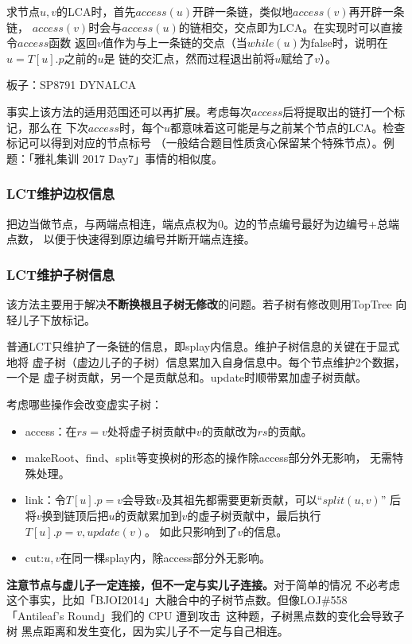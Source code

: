 求节点$u,v$的LCA时，首先$access(u)$开辟一条链，类似地$access(v)$再开辟一条链，
$access(v)$时会与$access(u)$的链相交，交点即为LCA。在实现时可以直接令$access$函数
返回$v$值作为与上一条链的交点（当$while(u)$为false时，说明在$u=T[u].p$之前的$u$是
链的交汇点，然而过程退出前将$u$赋给了$v$）。

板子：SP8791 DYNALCA


事实上该方法的适用范围还可以再扩展。考虑每次$access$后将提取出的链打一个标记，那么在
下次$access$时，每个$u$都意味着这可能是与之前某个节点的LCA。检查标记可以得到对应的节点标号
（一般结合题目性质贪心保留某个特殊节点）。例题：「雅礼集训 2017 Day7」事情的相似度。
\subsubsection{LCT维护边权信息}
把边当做节点，与两端点相连，端点点权为0。边的节点编号最好为边编号+总端点数，
以便于快速得到原边编号并断开端点连接。
\subsubsection{LCT维护子树信息}
该方法主要用于解决{\bfseries 不断换根且子树无修改}的问题。若子树有修改则用TopTree
向轻儿子下放标记。

普通LCT只维护了一条链的信息，即splay内信息。维护子树信息的关键在于显式地将
虚子树（虚边儿子的子树）信息累加入自身信息中。每个节点维护2个数据，一个是
虚子树贡献，另一个是贡献总和。update时顺带累加虚子树贡献。

考虑哪些操作会改变虚实子树：
\begin{itemize}
    \item access：在$rs=v$处将虚子树贡献中$v$的贡献改为$rs$的贡献。
    \item makeRoot、find、split等变换树的形态的操作除access部分外无影响，
    无需特殊处理。
    \item link：令$T[u].p=v$会导致$v$及其祖先都需要更新贡献，可以``$split(u,v)$''
    后将$v$换到链顶后把$u$的贡献累加到$v$的虚子树贡献中，最后执行$T[u].p=v,update(v)$。
    如此只影响到了$v$的信息。
    \item cut:$u,v$在同一棵splay内，除access部分外无影响。
\end{itemize}

{\bfseries 注意节点与虚儿子一定连接，但不一定与实儿子连接。}对于简单的情况
不必考虑这个事实，比如「BJOI2014」大融合中的子树节点数。但像LOJ\#558
「Antileaf's Round」我们的 CPU 遭到攻击~这种题，子树黑点数的变化会导致子树
黑点距离和发生变化，因为实儿子不一定与自己相连。

